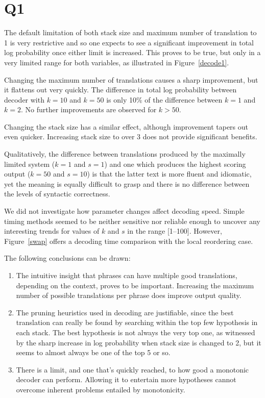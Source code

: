 \section*{Q1}
The default limitation of both stack size and maximum number of translation
to 1 is very restrictive and so one expects to see a significant improvement
in total log probability once either limit is increased. This proves to be
true, but only in a very limited range for both variables, as illustrated in
Figure~\ref{decode1}.
\vspace{4mm} %

Changing the maximum number of translations causes a sharp improvement, but
it flattens out very quickly. The difference in total log probability
between decoder with $k=10$ and $k=50$ is only 10\% of the difference
between $k=1$ and $k=2$. No further improvements are observed for $k>50$.

Changing the stack size has a similar effect, although improvement tapers
out even quicker. Increasing stack size to over 3 does not provide
significant benefits.

Qualitatively, the difference between translations produced by the maximally
limited system ($k=1$ and $s=1$) and one which produces the highest scoring
output ($k=50$ and $s=10$) is that the latter text is more fluent and
idiomatic, yet the meaning is equally difficult to grasp and there is no
difference between the levels of syntactic correctness.

We did not investigate how parameter changes affect decoding speed. Simple
timing methods seemed to be neither sensitive nor reliable enough to uncover
any interesting trends for values of $k$ and $s$ in the range [1--100]. However,
Figure~\ref{swap} offers a decoding time comparison with the local reordering case. 
\vspace{4mm} %

The following conclusions can be drawn:
\begin{enumerate}
	\item
    The intuitive insight that phrases can have multiple good translations,
    depending on the context, proves to be important. Increasing the maximum
    number of possible translations per phrase does improve output quality.
	\item
    The pruning heuristics used in decoding are justifiable, since the best
    translation can really be found by searching within the top few
    hypothesis in each stack. The best hypothesis is not always the very top
    one, as witnessed by the sharp increase in log probability when stack
    size is changed to 2, but it seems to almost always be one of the top 5
    or so.
	\item
    There is a limit, and one that's quickly reached, to how good a
    monotonic decoder can perform. Allowing it to entertain more hypotheses
    cannot overcome inherent problems entailed by monotonicity.
\end{enumerate}

